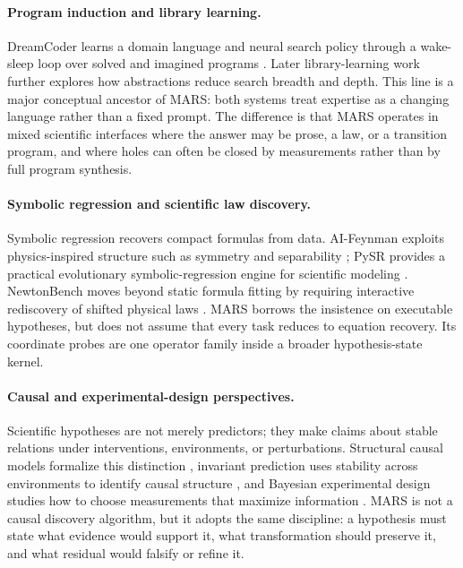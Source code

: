 \documentclass[letterpaper]{article}
\newcommand{\mars}{\textsc{MARS}\xspace}
\begin{document}
\paragraph{Program induction and library learning.}
DreamCoder learns a domain language and neural search policy through a
wake-sleep loop over solved and imagined programs \citep{dreamcoder}. Later
library-learning work further explores how abstractions reduce search breadth
and depth. This line is a major conceptual ancestor of \mars: both systems
treat expertise as a changing language rather than a fixed prompt. The
difference is that \mars operates in mixed scientific interfaces where the
answer may be prose, a law, or a transition program, and where holes can often
be closed by measurements rather than by full program synthesis.

\paragraph{Symbolic regression and scientific law discovery.}
Symbolic regression recovers compact formulas from data. AI-Feynman exploits
physics-inspired structure such as symmetry and separability
\citep{aifeynman}; PySR provides a practical evolutionary symbolic-regression
engine for scientific modeling \citep{pysr}. NewtonBench moves beyond static
formula fitting by requiring interactive rediscovery of shifted physical laws
\citep{newtonbench}. \mars borrows the insistence on executable hypotheses, but
does not assume that every task reduces to equation recovery. Its coordinate
probes are one operator family inside a broader hypothesis-state kernel.

\paragraph{Causal and experimental-design perspectives.}
Scientific hypotheses are not merely predictors; they make claims about stable
relations under interventions, environments, or perturbations. Structural
causal models formalize this distinction \citep{pearl}, invariant prediction
uses stability across environments to identify causal structure
\citep{invariant}, and Bayesian experimental design studies how to choose
measurements that maximize information \citep{bed}. \mars is not a causal
discovery algorithm, but it adopts the same discipline: a hypothesis must state
what evidence would support it, what transformation should preserve it, and
what residual would falsify or refine it.
\end{document}
